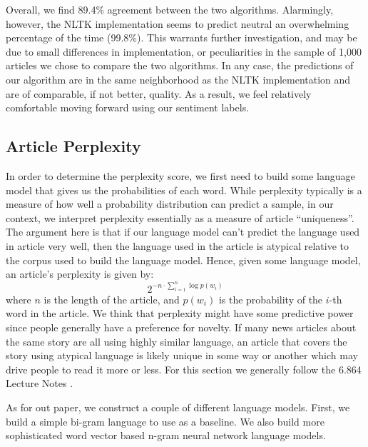 \documentclass[fleqn,12pt]{SelfArx} %
\begin{document}
\vspace{10 mm}

Overall, we find 89.4\% agreement between the two algorithms. Alarmingly, however, the NLTK implementation seems to predict neutral an overwhelming percentage of the time (99.8\%). This warrants further investigation, and may be due to small differences in implementation, or peculiarities in the sample of 1,000 articles we chose to compare the two algorithms. In any case, the predictions of our algorithm are in the same neighborhood as the NLTK implementation and are of comparable, if not better, quality. As a result, we feel relatively comfortable moving forward using our sentiment labels.

\subsection{Article Perplexity}
In order to determine the perplexity score, we first need to build some language model that gives us the probabilities of each word. While perplexity typically is a measure of how well a probability distribution can predict a sample, in our context, we interpret perplexity essentially as a measure of article “uniqueness”. The argument here is that if our language model can’t predict the language used in article very well, then the language used in the article is atypical relative to the corpus used to build the language model. Hence, given some language model, an article's perplexity is given by:
\begin{equation}
	2^{-n\cdot\sum_{i=1}^n \log p(w_i)}
\end{equation}
where $n$ is the length of the article, and $p(w_i)$ is the probability of the $i$-th word in the article. We think that perplexity might have some predictive power since people generally have a preference for novelty. If many news articles about the same story are all using highly similar language, an article that covers the story using atypical language is likely unique in some way or another which may drive people to read it more or less. For this section we generally follow the 6.864 Lecture Notes \cite{6864Lec23}.

As for out paper, we construct a couple of different language models. First, we build a simple bi-gram language to use as a baseline. We also build more sophisticated word vector based n-gram neural network language models.
\end{document}
